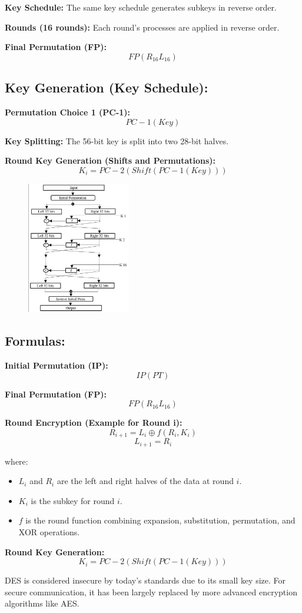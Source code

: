 \documentclass[11pt]{article}
\begin{document}
\textbf{Key Schedule:}
The same key schedule generates subkeys in reverse order.

\textbf{Rounds (16 rounds):}
Each round's processes are applied in reverse order.

\textbf{Final Permutation (FP):}
\[ FP(R_{16}L_{16}) \]

\subsection*{Key Generation (Key Schedule):}
\textbf{Permutation Choice 1 (PC-1):}
\[ PC-1(Key) \]

\textbf{Key Splitting:}
The 56-bit key is split into two 28-bit halves.

\textbf{Round Key Generation (Shifts and Permutations):}
\[ K_i = PC-2(Shift(PC-1(Key))) \]


\begin{figure}
    \centering
    \includegraphics[width=0.4\textwidth]{image2.3.PNG} %
    \caption{} %
\end{figure}



\subsection*{Formulas:}
\textbf{Initial Permutation (IP):}
\[ IP(PT) \]

\textbf{Final Permutation (FP):}
\[ FP(R_{16}L_{16}) \]

\textbf{Round Encryption (Example for Round i):}
\[ R_{i+1} = L_i \oplus f(R_i, K_i) \]
\[ L_{i+1} = R_i \]

where:
\begin{itemize}
    \item \(L_i\) and \(R_i\) are the left and right halves of the data at round \(i\).
    \item \(K_i\) is the subkey for round \(i\).
    \item \(f\) is the round function combining expansion, substitution, permutation, and XOR operations.
\end{itemize}

\textbf{Round Key Generation:}
\[ K_i = PC-2(Shift(PC-1(Key))) \]

DES is considered insecure by today's standards due to its small key size. For secure communication, it has been largely replaced by more advanced encryption algorithms like AES.
\end{document}
